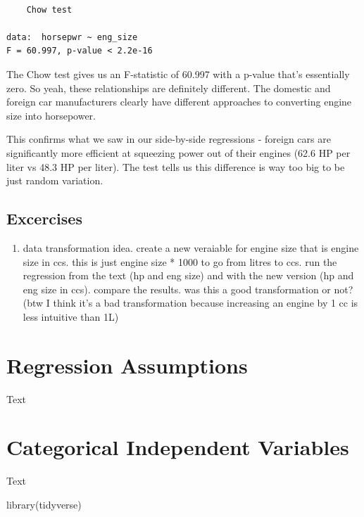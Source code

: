 \documentclass[
  letterpaper,
]{book}
\newenvironment{Shaded}{\begin{snugshade}}{\end{snugshade}}
\newcommand{\FunctionTok}[1]{\textcolor[rgb]{0.28,0.35,0.67}{#1}}
\newcommand{\NormalTok}[1]{\textcolor[rgb]{0.00,0.23,0.31}{#1}}
\providecommand{\tightlist}{%
  \setlength{\itemsep}{0pt}\setlength{\parskip}{0pt}}\usepackage{longtable,booktabs,array}
\begin{document}
\begin{verbatim}

    Chow test

data:  horsepwr ~ eng_size
F = 60.997, p-value < 2.2e-16
\end{verbatim}

The Chow test gives us an F-statistic of 60.997 with a p-value that's
essentially zero. So yeah, these relationships are definitely different.
The domestic and foreign car manufacturers clearly have different
approaches to converting engine size into horsepower.

This confirms what we saw in our side-by-side regressions - foreign cars
are significantly more efficient at squeezing power out of their engines
(62.6 HP per liter vs 48.3 HP per liter). The test tells us this
difference is way too big to be just random variation.

\section{Excercises}\label{excercises}

\begin{enumerate}
\def\labelenumi{\arabic{enumi}.}
\tightlist
\item
  data transformation idea. create a new veraiable for engine size that
  is engine size in ccs. this is just engine size * 1000 to go from
  litres to ccs. run the regression from the text (hp and eng size) and
  with the new version (hp and eng size in ccs). compare the results.
  was this a good transformation or not? (btw I think it's a bad
  transformation because increasing an engine by 1 cc is less intuitive
  than 1L)
\end{enumerate}


\chapter{Regression Assumptions}\label{sec-assumptions}

Text


\chapter{Categorical Independent Variables}\label{sec-categoricalIV}

Text

\begin{Shaded}
\begin{Highlighting}[]
\FunctionTok{library}\NormalTok{(tidyverse)}
\end{Highlighting}
\end{Shaded}
\end{document}
